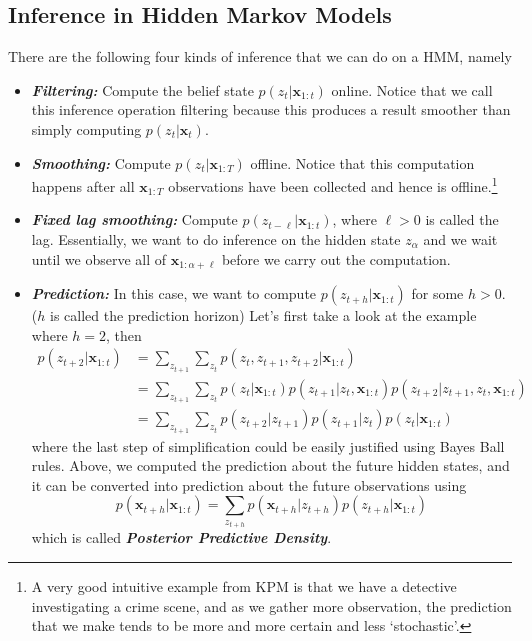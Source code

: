 \documentclass[11pt]{article}
\newcommand{\bx}{\mathbf{x}}
\begin{document}
\subsection{Inference in Hidden Markov Models}
There are the following four kinds of inference that we can do on a HMM, namely
\begin{itemize}
    \item \textit{\textbf{Filtering:}} Compute the belief state $p\left(z_{t} | \mathbf{x}_{1: t}\right)$ online. Notice that we call this inference operation filtering because this produces a result smoother than simply computing $p(z_t|\bx_{t})$.
    \item \textit{\textbf{Smoothing:}} Compute $p\left(z_{t} | \mathbf{x}_{1: T}\right)$ offline. Notice that this computation happens after all $\bx_{1:T}$ observations have been collected and hence is offline.\footnote{A very good intuitive example from KPM is that we have a detective investigating a crime scene, and as we gather more observation, the prediction that we make tends to be more and more certain and less `stochastic'.}
    \item \textit{\textbf{Fixed lag smoothing:}} Compute $p\left(z_{t-\ell} | \mathbf{x}_{1: t}\right)$, where $\ell>0$ is called the lag. Essentially, we want to do inference on the hidden state $z_\alpha$ and we wait until we observe all of $\bx_{1:\alpha + \ell}$ before we carry out the computation. 
    \item \textit{\textbf{Prediction:}} In this case, we want to compute $p\left(z_{t+h} | \mathbf{x}_{1: t}\right)$ for some $h > 0$. ($h$ is called the prediction horizon) Let's first take a look at the example where $h = 2$, then
    \begin{align}
        p(z_{t+2}|\bx_{1:t}) 
        &= \sum_{z_{t+1}}\sum_{z_t}p(z_t, z_{t+1}, z_{t+2}|\bx_{1:t}) \\
        &= \sum_{z_{t+1}}\sum_{z_t}p(z_t |\bx_{1:t})p(z_{t+1}|z_t, \bx_{1:t})p(z_{t+2}|z_{t+1}, z_{t}, \bx_{1:t}) \\
        &= \sum_{z_{t+1}} \sum_{z_{t}} p\left(z_{t+2} | z_{t+1}\right) p\left(z_{t+1} | z_{t}\right) p\left(z_{t} | \mathbf{x}_{1: t}\right)
    \end{align}
    where the last step of simplification could be easily justified using Bayes Ball rules. Above, we computed the prediction about the future hidden states, and it can be converted into prediction about the future observations using
    \begin{equation}
        p\left(\mathbf{x}_{t+h} | \mathbf{x}_{1: t}\right)=\sum_{z_{t+h}} p\left(\mathbf{x}_{t+h} | z_{t+h}\right) p\left(z_{t+h} | \mathbf{x}_{1: t}\right)
    \end{equation}
    which is called \textit{\textbf{Posterior Predictive Density}}.
\end{itemize}
\end{document}
